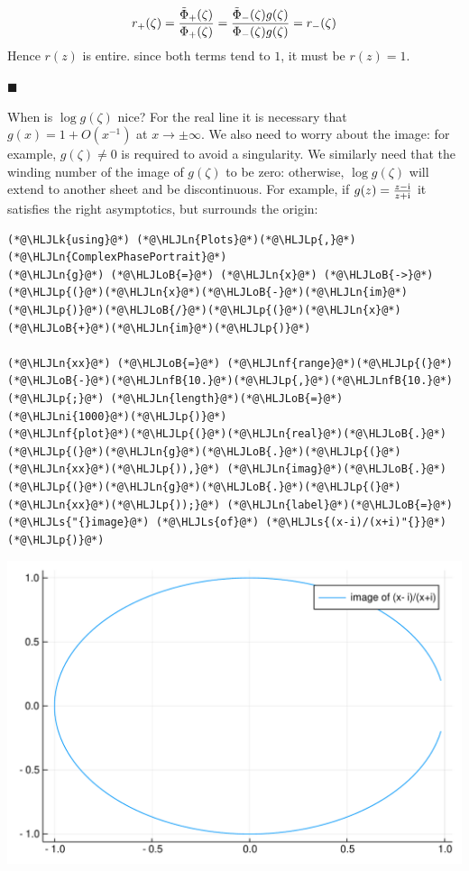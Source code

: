 \documentclass[12pt,a4paper]{article}
\newcommand{\HLJLk}[1]{\textcolor[RGB]{148,91,176}{\textbf{#1}}}
\newcommand{\HLJLn}[1]{#1}
\newcommand{\HLJLnf}[1]{\textcolor[RGB]{66,102,213}{#1}}
\newcommand{\HLJLs}[1]{\textcolor[RGB]{201,61,57}{#1}}
\newcommand{\HLJLnfB}[1]{\textcolor[RGB]{59,151,46}{#1}}
\newcommand{\HLJLni}[1]{\textcolor[RGB]{59,151,46}{#1}}
\newcommand{\HLJLoB}[1]{\textcolor[RGB]{102,102,102}{\textbf{#1}}}
\newcommand{\HLJLp}[1]{#1}
\def\I{ {\rm i} }
\begin{document}
\[
r_+(\zeta) = {\tilde\Phi_+(\zeta) \over \Phi_+(\zeta)} = {\tilde\Phi_-(\zeta) g(\zeta) \over \Phi_-(\zeta) g(\zeta)} = r_-(\zeta)
\]
Hence $r(z)$ is entire. since both terms tend to $1$, it must be $r(z) = 1$.

\ensuremath{\blacksquare}

When is $\log g(\zeta)$ nice? For the real line it is necessary that $g(x) = 1 + O(x^{-1})$ at $x \rightarrow \pm \infty$. We also need to worry about the image:  for example, $g(\zeta) \neq 0$ is required to avoid a singularity.  We similarly need that the winding number of the image of $g(\zeta)$ to be zero:  otherwise, $\log g(\zeta)$ will extend to another sheet and be discontinuous.   For example, if $g(z) = {z-\I \over z+\I}$ it satisfies the right asymptotics, but surrounds the origin:


\begin{lstlisting}
(*@\HLJLk{using}@*) (*@\HLJLn{Plots}@*)(*@\HLJLp{,}@*) (*@\HLJLn{ComplexPhasePortrait}@*)
(*@\HLJLn{g}@*) (*@\HLJLoB{=}@*) (*@\HLJLn{x}@*) (*@\HLJLoB{->}@*) (*@\HLJLp{(}@*)(*@\HLJLn{x}@*)(*@\HLJLoB{-}@*)(*@\HLJLn{im}@*)(*@\HLJLp{)}@*)(*@\HLJLoB{/}@*)(*@\HLJLp{(}@*)(*@\HLJLn{x}@*)(*@\HLJLoB{+}@*)(*@\HLJLn{im}@*)(*@\HLJLp{)}@*)

(*@\HLJLn{xx}@*) (*@\HLJLoB{=}@*) (*@\HLJLnf{range}@*)(*@\HLJLp{(}@*)(*@\HLJLoB{-}@*)(*@\HLJLnfB{10.}@*)(*@\HLJLp{,}@*)(*@\HLJLnfB{10.}@*)(*@\HLJLp{;}@*) (*@\HLJLn{length}@*)(*@\HLJLoB{=}@*)(*@\HLJLni{1000}@*)(*@\HLJLp{)}@*)
(*@\HLJLnf{plot}@*)(*@\HLJLp{(}@*)(*@\HLJLn{real}@*)(*@\HLJLoB{.}@*)(*@\HLJLp{(}@*)(*@\HLJLn{g}@*)(*@\HLJLoB{.}@*)(*@\HLJLp{(}@*)(*@\HLJLn{xx}@*)(*@\HLJLp{)),}@*) (*@\HLJLn{imag}@*)(*@\HLJLoB{.}@*)(*@\HLJLp{(}@*)(*@\HLJLn{g}@*)(*@\HLJLoB{.}@*)(*@\HLJLp{(}@*)(*@\HLJLn{xx}@*)(*@\HLJLp{));}@*) (*@\HLJLn{label}@*)(*@\HLJLoB{=}@*)(*@\HLJLs{"{}image}@*) (*@\HLJLs{of}@*) (*@\HLJLs{(x-i)/(x+i)"{}}@*)(*@\HLJLp{)}@*)
\end{lstlisting}

\includegraphics[width=\linewidth]{figures/Lecture25_1_1.pdf}
\end{document}
